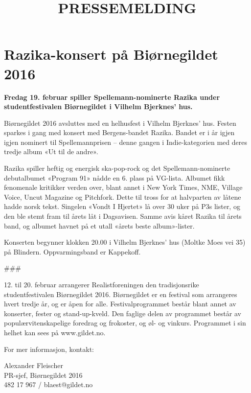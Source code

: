 \documentclass{article}[12pt]
\begin{document}
\title{PRESSEMELDING}
\maketitle
{}
\section*{Razika-konsert på Biørnegildet 2016}

\textbf{Fredag 19. februar spiller Spellemann-nominerte Razika
    under studentfestivalen Biørnegildet i Vilhelm Bjerknes' hus.}

Biørnegildet 2016 avsluttes med en helhusfest i 
Vilhelm Bjerknes' hus. Festen sparkes i gang med konsert med Bergens-bandet Razika.
Bandet er i år igjen igjen nominert til Spellemannprisen – 
denne gangen i Indie-kategorien
med deres tredje album «Ut til de andre».

Razika spiller heftig og energisk ska-pop-rock og det Spellemann-nominerte 
debutalbumet «Program 91» nådde en 6. plass på VG-lista. 
Albumet fikk fenomenale kritikker verden over, blant annet i New York Times, NME, 
Village Voice, Uncut Magazine og Pitchfork. Dette til tross for at halvparten 
av låtene hadde norsk tekst.   
Singelen «Vondt I Hjertet» lå over 30 uker på P3s lister, 
og den ble stemt fram til årets låt i Dagsavisen. 
Samme avis kåret Razika til årets band, 
og albumet havnet på et utall «årets beste album»-lister. 

Konserten begynner klokken 20.00 i Vilhelm Bjerknes' hus (Moltke Moes vei 35) på Blindern. 
Oppvarmingsband er Kappekoff.

\#\#\#

12. til 20. februar arrangerer Realistforeningen den tradisjonsrike 
studentfestivalen Biørnegildet 2016.
Biørnegildet er en festival som arrangeres hvert tredje år,
og er åpen for alle.
Festivalprogrammet består blant annet av konserter, fester og stand-up-kveld.
Den faglige delen av programmet består av 
populærvitenskapelige foredrag og frokoster, og øl- og vinkurs.
Programmet i sin helhet kan sees på www.gildet.no.

For mer informasjon, kontakt:

Alexander Fleischer\\
PR-sjef, Biørnegildet 2016\\
482 17 967 / blaest@gildet.no
\end{document}
